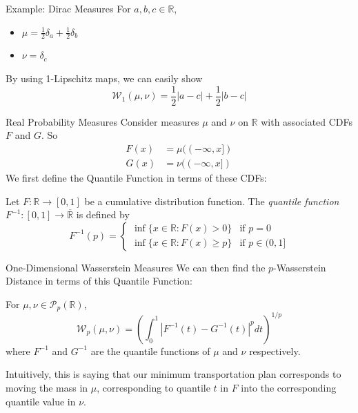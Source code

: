 \documentclass{beamer}
\begin{document}
\begin{frame}{Example: Dirac Measures}
For $a,b,c \in \mathbb{R}$, \begin{itemize}
  \item $\mu = \frac{1}{2} \delta_a + \frac{1}{2} \delta _b$
  \item $\nu = \delta _c$
\end{itemize}
By using 1-Lipschitz maps, we can easily show \[\mathcal{W}_1(\mu, \nu) = \frac{1}{2} |a-c| + \frac{1}{2} |b-c|\]
\end{frame}

\begin{frame}{Real Probability Measures}
  Consider measures \( \mu \) and \( \nu \) on \( \mathbb{R} \) with associated CDFs \( F \) and \( G \). So \begin{align*}F(x) &= \mu ((-\infty, x]) \\ G(x) &= \nu ((-\infty, x])\end{align*}
We first define the Quantile Function in terms of these CDFs:

\begin{definition}
Let \(F\colon\mathbb{R}\to[0,1]\) be a cumulative distribution function.  The \emph{quantile function} \(F^{-1}\colon[0,1]\to \overline{\mathbb{R}}\) is defined by
\[
  F^{-1}(p) = \begin{cases}\inf\{x \in \mathbb{R} : F(x) > 0\} & \text{if } p = 0 \\ \inf\{x \in \mathbb{R} : F(x) \geq p\} & \text{if } p \in (0,1]\end{cases}
\]
\end{definition}
\end{frame}

\begin{frame}{One-Dimensional Wasserstein Measures}
We can then find the $p$-Wasserstein Distance in terms of this Quantile Function:
\begin{theorem} \label{thm:1d} For $\mu, \nu \in \mathcal{P}_p(\mathbb{R})$,
\[
\mathcal{W}_p(\mu,\nu) = \left(\int_0^1 |F^{-1}(t) - G^{-1}(t)|^p dt\right)^{1/p}
\]
where \( F^{-1} \) and \( G^{-1} \) are the quantile functions of $\mu$ and $\nu$ respectively.
\end{theorem}
\noindent
Intuitively, this is saying that our minimum transportation plan corresponds to moving the mass in $\mu$, corresponding to quantile $t$ in $F$ into the corresponding quantile value in $\nu$.

\end{frame}
\end{document}
